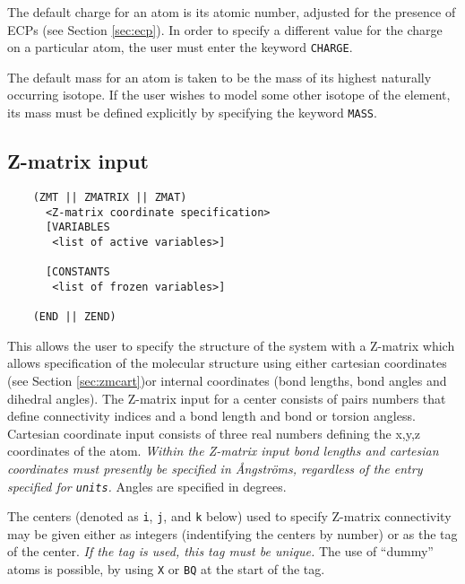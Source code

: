 The default charge for an atom is its atomic number, adjusted for the
presence of ECPs (see Section \ref{sec:ecp}).  In order to specify a
different value for the charge on a particular atom, the user must
enter the keyword \verb+CHARGE+.

The default mass for an atom is taken to be the mass of its highest
naturally occurring isotope.  If the user wishes to model some other
isotope of the element, its mass must be defined explicitly by
specifying the keyword \verb+MASS+.


\subsection{Z-matrix input}
\label{sec:Z-matrix}

\begin{verbatim}
    (ZMT || ZMATRIX || ZMAT)
      <Z-matrix coordinate specification>
      [VARIABLES
       <list of active variables>]

      [CONSTANTS
       <list of frozen variables>]

    (END || ZEND)
\end{verbatim}

This allows the user to specify the structure of the system with a
Z-matrix which allows specification of the molecular structure using
either cartesian coordinates (see Section \ref{sec:zmcart})or internal
coordinates (bond lengths, bond angles and dihedral angles).  The
Z-matrix input for a center consists of pairs numbers that define
connectivity indices and a bond length and bond or torsion angless.
Cartesian coordinate input consists of three real numbers defining the
x,y,z coordinates of the atom.  {\em Within the Z-matrix input bond
  lengths and cartesian coordinates must presently be specified in
  {\AA}ngstr{\"o}ms, regardless of the entry specified for
  \verb+units+.} Angles are specified in degrees.

%

The centers (denoted as \verb+i+, \verb+j+, and \verb+k+ below) used
to specify Z-matrix connectivity may be given either as integers
(indentifying the centers by number) or as the tag of the center.
{\em If the tag is used, this tag must be unique.} The use of
``dummy'' atoms is possible, by using \verb+X+ or \verb+BQ+ at the
start of the tag.

